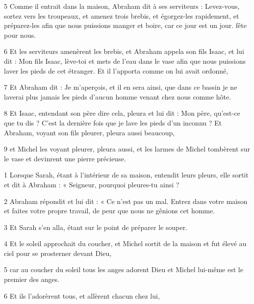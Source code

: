 \par 5 Comme il entrait dans la maison, Abraham dit à ses serviteurs : Levez-vous, sortez vers les troupeaux, et amenez trois brebis, et égorgez-les rapidement, et préparez-les afin que nous puissions manger et boire, car ce jour est un jour. fête pour nous.

\par 6 Et les serviteurs amenèrent les brebis, et Abraham appela son fils Isaac, et lui dit : Mon fils Isaac, lève-toi et mets de l'eau dans le vase afin que nous puissions laver les pieds de cet étranger. Et il l'apporta comme on lui avait ordonné,

\par 7 Et Abraham dit : Je m'aperçois, et il en sera ainsi, que dans ce bassin je ne laverai plus jamais les pieds d'aucun homme venant chez nous comme hôte.

\par 8 Et Isaac, entendant son père dire cela, pleura et lui dit : Mon père, qu'est-ce que tu dis ? C'est la dernière fois que je lave les pieds d'un inconnu ? Et Abraham, voyant son fils pleurer, pleura aussi beaucoup,

\par 9 et Michel les voyant pleurer, pleura aussi, et les larmes de Michel tombèrent sur le vase et devinrent une pierre précieuse.


\par 1 Lorsque Sarah, étant à l'intérieur de sa maison, entendit leurs pleurs, elle sortit et dit à Abraham : « Seigneur, pourquoi pleures-tu ainsi ?

\par 2 Abraham répondit et lui dit : « Ce n'est pas un mal. Entrez dans votre maison et faites votre propre travail, de peur que nous ne gênions cet homme.

\par 3 Et Sarah s'en alla, étant sur le point de préparer le souper.

\par 4 Et le soleil approchait du coucher, et Michel sortit de la maison et fut élevé au ciel pour se prosterner devant Dieu,

\par 5 car au coucher du soleil tous les anges adorent Dieu et Michel lui-même est le premier des anges.

\par 6 Et ils l'adorèrent tous, et allèrent chacun chez lui,

